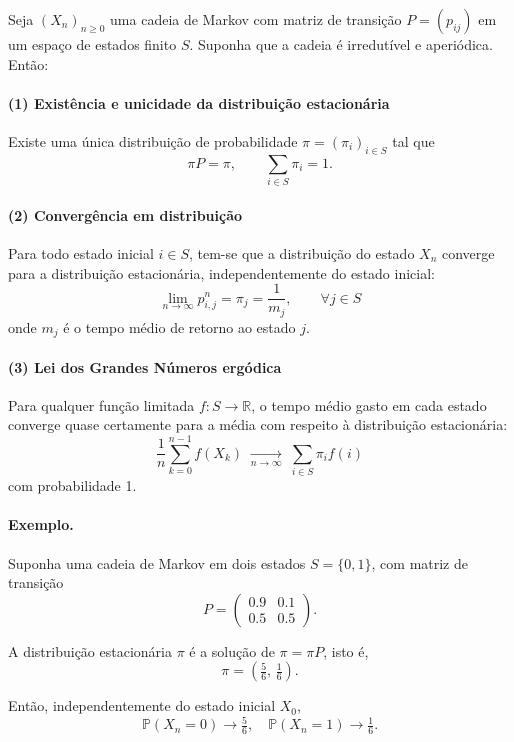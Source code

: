 \documentclass[12pt,letterpaper]{article}
\begin{document}
Seja $(X_n)_{n \geq 0}$ uma cadeia de Markov com matriz de transição
$P = (p_{ij})$ em um espaço de estados finito $S$.  Suponha que a
cadeia é irredutível e aperiódica. Então:

\paragraph{(1) Existência e unicidade da distribuição estacionária}
Existe uma única distribuição de probabilidade 
$\pi = (\pi_i)_{i \in S}$ tal que
\[
\pi P = \pi, 
\qquad
\sum_{i \in S} \pi_i = 1.
\]

\paragraph{(2) Convergência em distribuição}
Para todo estado inicial $i \in S$, tem-se que a distribuição do estado
$X_n$ converge para a distribuição estacionária, independentemente do
estado inicial:
\[
\lim_{n \to \infty} p_{i,j}^n = \pi_j =\frac 1{m_j},
\qquad \forall j \in S
\]
onde $m_j$ é o tempo médio de retorno ao estado $j$.

\paragraph{(3) Lei dos Grandes Números ergódica}
Para qualquer função limitada $f : S \to \mathbb{R}$, o tempo médio
gasto em cada estado converge quase certamente para a média com
respeito à distribuição estacionária:
\[
\frac{1}{n} \sum_{k=0}^{n-1} f(X_k)
\;\xrightarrow[n \to \infty]{}\;
\sum_{i \in S} \pi_i f(i)
\]
com probabilidade 1.

\bigskip


\paragraph{Exemplo.}
Suponha uma cadeia de Markov em dois estados \(S = \{0,1\}\), com matriz de transição
\[
P = 
\begin{pmatrix}
0.9 & 0.1 \\
0.5 & 0.5
\end{pmatrix}.
\]

A distribuição estacionária \(\pi\) é a solução de \(\pi = \pi P\), isto é,
\[
\pi = \left( \tfrac{5}{6}, \, \tfrac{1}{6} \right).
\]

Então, independentemente do estado inicial \(X_0\),
\[
\mathbb{P}(X_n = 0) \to \tfrac{5}{6}, 
\quad 
\mathbb{P}(X_n = 1) \to \tfrac{1}{6}.
\]
\end{document}
